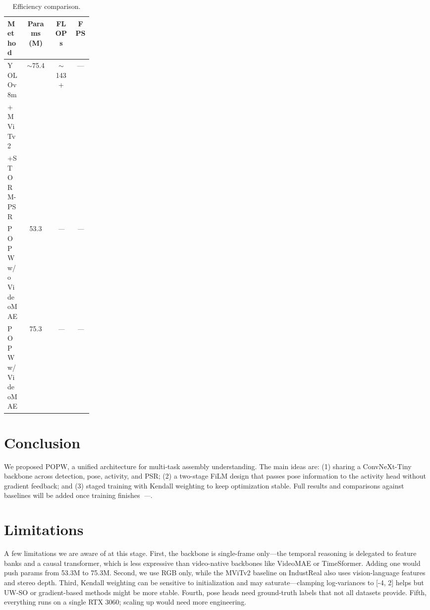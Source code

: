\documentclass[10pt,twocolumn]{article}
\newcommand{\popw}{POPW}
\newcommand{\todo}{\textit{---}}
\newcommand{\popwres}{\todo}
\begin{document}
\begin{table}[htbp]
\centering
\small
\caption{Efficiency comparison.}
\label{tab:efficiency}
\begin{tabular}{>{\raggedright\arraybackslash}p{0.2\linewidth}c c c}
\toprule
\textbf{Method} & \textbf{Params (M)} & \textbf{FLOPs} & \textbf{FPS} \\
\midrule
YOLOv8m&$\sim$75.4&$\sim$143+& --- \\
 +MViTv2& & &\\
 +STORM-PSR& & &\\
\popw{} w/o VideoMAE & 53.3 & \popwres & \popwres \\
\popw{} w/ VideoMAE & 75.3 & \popwres & \popwres \\
\bottomrule
\end{tabular}
\end{table}

\FloatBarrier

\section{Conclusion}
\label{sec:conclusion}

We proposed \popw{}, a unified architecture for multi-task assembly understanding. The main ideas are: (1) sharing a ConvNeXt-Tiny backbone across detection, pose, activity, and PSR; (2) a two-stage FiLM design that passes pose information to the activity head without gradient feedback; and (3) staged training with Kendall weighting to keep optimization stable. Full results and comparisons against baselines will be added once training finishes~\popwres.

\section{Limitations}
\label{sec:limitations}

A few limitations we are aware of at this stage. First, the backbone is single-frame only---the temporal reasoning is delegated to feature banks and a causal transformer, which is less expressive than video-native backbones like VideoMAE or TimeSformer. Adding one would push params from 53.3M to 75.3M. Second, we use RGB only, while the MViTv2 baseline on IndustReal also uses vision-language features and stereo depth. Third, Kendall weighting can be sensitive to initialization and may saturate---clamping log-variances to [-4, 2] helps but UW-SO or gradient-based methods might be more stable. Fourth, pose heads need ground-truth labels that not all datasets provide. Fifth, everything runs on a single RTX 3060; scaling up would need more engineering.
\end{document}
